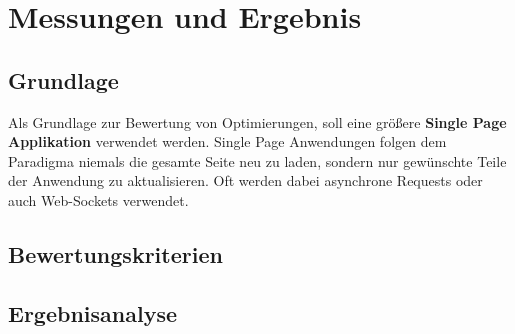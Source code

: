 \section{Messungen und Ergebnis}
\subsection{Grundlage}
Als Grundlage zur Bewertung von Optimierungen, soll eine größere \textbf{Single Page Applikation} verwendet werden. Single Page Anwendungen folgen dem Paradigma niemals die gesamte Seite neu zu laden, sondern nur gewünschte Teile der Anwendung zu aktualisieren. Oft werden dabei asynchrone Requests oder auch Web-Sockets verwendet.

\subsection{Bewertungskriterien}

\subsection{Ergebnisanalyse}